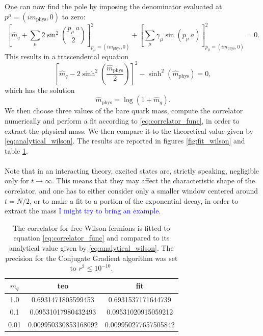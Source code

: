 One can now find the pole by imposing the denominator evaluated at $p^\mu =(im_\text{phys}, 0)$ to zero:
\begin{equation*}
    \left[\hat{m}_q + \sum_\mu 2 \sin ^2\left(\frac{p_\mu \, a}{2}\right)\right]^2_{p_\mu = (im_\text{phys}, 0)} + \left[\sum_\mu \gamma_\mu \sin \left(p_\mu \, a\right)\right]^2_{p_\mu = (im_\text{phys}, 0)} = 0.
\end{equation*}
This results in a trascendental equation 
\begin{equation*}
    \left[\hat{m}_q - 2 \sinh^2\left(\frac{\hat{m}_\text{phys}}{2}\right)\right]^2 - \sinh^2\left(\hat{m}_\text{phys}\right) = 0,
\end{equation*}
which has the solution 
\begin{equation}
    \hat{m}_\text{phys} = \log\left(1+\hat{m}_q\right).
    \label{eq:analytical_wilson}
\end{equation}
We then choose three values of the bare quark mass, compute the correlator numerically and perform a fit according to \eqref{eq:correlator_func}, in order to extract the physical mass. We then compare it to the theoretical value given by \eqref{eq:analytical_wilson}. The results are reported in figures \ref{fig:fit_wilson} and table \ref{tab:free_wilson_fit}. \\~\\
Note that in an interacting theory, excited states are, strictly speaking, negligible only for $t \to \infty$. This means that they may affect the characteristic shape of the correlator, and one has to either consider only a smaller window centered around $t=N/2$, or to make a fit to a portion of the exponential decay, in order to extract the mass \textcolor{blue}{I might try to bring an example}.
\newpage
\begin{table}[h!]
    \centering
    \begin{tabular}[pos]{ccc}
        \toprule
        $m_q$ & teo & fit \\
        \midrule 
        1.0 & 0.6931471805599453 & 0.6931537171644739 \\
        0.1 & 0.09531017980432493 & 0.09531020915059212 \\
        0.01 & 0.009950330853168092 & 0.009950277657505842 \\
        \bottomrule
    \end{tabular}
    \caption[Fit of the correlator for free Wilson fermions.]{The correlator for free Wilson fermions is fitted to equation \eqref{eq:correlator_func} and compared to its analytical value given by \eqref{eq:analytical_wilson}. The precision for the Conjugate Gradient algorithm was set to $r^2 \leq 10^{-10}$.}
    \label{tab:free_wilson_fit}
\end{table}
